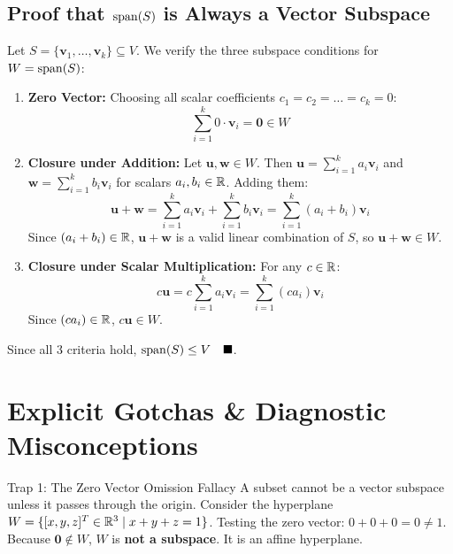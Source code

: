 \subsection{Proof that $\operatorname{span}(S)$ is Always a Vector Subspace}
Let $S = \{\mathbf{v}_1, \dots, \mathbf{v}_k\} \subseteq V$. We verify the three subspace conditions for $W = \operatorname{span}(S)$:
\begin{enumerate}
    \item \textbf{Zero Vector:} Choosing all scalar coefficients $c_1 = c_2 = \dots = c_k = 0$:
    \begin{equation}
    \sum_{i=1}^k 0 \cdot \mathbf{v}_i = \mathbf{0} \in W
    \end{equation}
    \item \textbf{Closure under Addition:} Let $\mathbf{u}, \mathbf{w} \in W$. Then $\mathbf{u} = \sum_{i=1}^k a_i \mathbf{v}_i$ and $\mathbf{w} = \sum_{i=1}^k b_i \mathbf{v}_i$ for scalars $a_i, b_i \in \mathbb{R}$.
    Adding them:
    \begin{equation}
    \mathbf{u} + \mathbf{w} = \sum_{i=1}^k a_i \mathbf{v}_i + \sum_{i=1}^k b_i \mathbf{v}_i = \sum_{i=1}^k (a_i + b_i) \mathbf{v}_i
    \end{equation}
    Since $(a_i + b_i) \in \mathbb{R}$, $\mathbf{u} + \mathbf{w}$ is a valid linear combination of $S$, so $\mathbf{u} + \mathbf{w} \in W$.
    \item \textbf{Closure under Scalar Multiplication:} For any $c \in \mathbb{R}$:
    \begin{equation}
    c\mathbf{u} = c \sum_{i=1}^k a_i \mathbf{v}_i = \sum_{i=1}^k (c a_i) \mathbf{v}_i
    \end{equation}
    Since $(c a_i) \in \mathbb{R}$, $c\mathbf{u} \in W$.
\end{enumerate}
Since all 3 criteria hold, $\operatorname{span}(S) \le V \quad \blacksquare$.

\section{Explicit Gotchas \& Diagnostic Misconceptions}

\begin{trapbox}{Trap 1: The Zero Vector Omission Fallacy}
A subset cannot be a vector subspace unless it passes through the origin.
Consider the hyperplane $W = \{[x, y, z]^T \in \mathbb{R}^3 \mid x + y + z = 1\}$. 
Testing the zero vector: $0 + 0 + 0 = 0 \neq 1$.
Because $\mathbf{0} \notin W$, $W$ is \textbf{not a subspace}. It is an affine hyperplane.
\end{trapbox}

